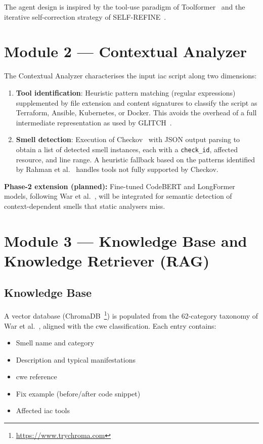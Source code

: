 \documentclass[12pt, a4paper]{report}
\begin{document}
The agent design is inspired by the tool-use paradigm of Toolformer~\citep{schick2023toolformer}
and the iterative self-correction strategy of SELF-REFINE~\citep{madaan2023selfrefine}.

\section{Module 2 --- Contextual Analyzer}

The Contextual Analyzer characterises the input \gls{iac} script along two dimensions:

\begin{enumerate}
  \item \textbf{Tool identification}: Heuristic pattern matching (regular expressions)
  supplemented by file extension and content signatures to classify the script as
  Terraform, Ansible, Kubernetes, or Docker. This avoids the overhead of a full
  intermediate representation as used by GLITCH~\citep{saavedra2022glitch}.

  \item \textbf{Smell detection}: Execution of Checkov~\citep{checkov2024} with JSON
  output parsing to obtain a list of detected smell instances, each with a
  \texttt{check\_id}, affected resource, and line range. A heuristic fallback based
  on the patterns identified by Rahman et al.~\citep{rahman2019seven} handles tools
  not fully supported by Checkov.
\end{enumerate}

\textbf{Phase-2 extension (planned):} Fine-tuned CodeBERT and LongFormer models,
following War et al.~\citep{war2025detection}, will be integrated for semantic
detection of context-dependent smells that static analysers miss.

\section{Module 3 --- Knowledge Base and Knowledge Retriever (RAG)}

\subsection{Knowledge Base}

A vector database (ChromaDB~\footnote{\url{https://www.trychroma.com}}) is populated
from the 62-category taxonomy of War et al.~\citep{war2025taxonomy}, aligned with
the \gls{cwe} classification. Each entry contains:

\begin{itemize}
  \item Smell name and category
  \item Description and typical manifestations
  \item \gls{cwe} reference
  \item Fix example (before/after code snippet)
  \item Affected \gls{iac} tools
\end{itemize}
\end{document}

